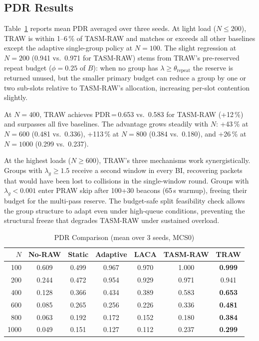 \documentclass[conference]{IEEEtran}
\begin{document}
\subsection{PDR Results}

Table~\ref{tab:pdr} reports mean PDR averaged over three seeds.
At light load ($N\!\leq\!200$), TRAW is within 1--6\,\% of TASM-RAW
and matches or exceeds all other baselines except the adaptive
single-group policy at $N\!=\!100$.
The slight regression at $N\!=\!200$ (0.941 vs.\ 0.971 for TASM-RAW)
stems from TRAW's pre-reserved repeat budget ($\phi\!=\!0.25$ of
$B$): when no group has $\lambda\!\geq\!\theta_\mathrm{repeat}$ the
reserve is returned unused, but the smaller primary budget can reduce
a group by one or two sub-slots relative to TASM-RAW's allocation,
increasing per-slot contention slightly.

At $N\!=\!400$, TRAW achieves PDR\,=\,0.653 vs.\ 0.583 for TASM-RAW
(+12\,\%) and surpasses all five baselines.
The advantage grows steadily with $N$: +43\,\% at $N\!=\!600$
(0.481 vs.\ 0.336), +113\,\% at $N\!=\!800$ (0.384 vs.\ 0.180),
and +26\,\% at $N\!=\!1000$ (0.299 vs.\ 0.237).

At the highest loads ($N\!\geq\!600$), TRAW's three mechanisms work
synergistically.
Groups with $\lambda_g\!\geq\!1.5$ receive a second window in every
BI, recovering packets that would have been lost to collisions in the
single-window round.
Groups with $\lambda_g\!<\!0.001$ enter PRAW skip after 100+30 beacons
(65\,s warmup), freeing their budget for the multi-pass reserve.
The budget-safe split feasibility check allows the group structure to
adapt even under high-queue conditions, preventing the structural
freeze that degrades TASM-RAW under sustained overload.

\begin{table}[!t]
\renewcommand{\arraystretch}{1.15}
\caption{PDR Comparison (mean over 3 seeds, MCS0)}
\label{tab:pdr}
\centering
\setlength{\tabcolsep}{4pt}
\begin{tabular}{@{}rcccccc@{}}
\toprule
$N$ & No-RAW & Static & Adaptive & LACA & TASM-RAW & \textbf{TRAW} \\
\midrule
 100 & 0.609 & 0.499 & 0.967 & 0.970 & 1.000 & \textbf{0.999} \\
 200 & 0.244 & 0.472 & 0.954 & 0.929 & 0.971 & 0.941 \\
 400 & 0.128 & 0.366 & 0.434 & 0.389 & 0.583 & \textbf{0.653} \\
 600 & 0.085 & 0.265 & 0.256 & 0.226 & 0.336 & \textbf{0.481} \\
 800 & 0.063 & 0.192 & 0.172 & 0.152 & 0.180 & \textbf{0.384} \\
1000 & 0.049 & 0.151 & 0.127 & 0.112 & 0.237 & \textbf{0.299} \\
\bottomrule
\end{tabular}
\end{table}
\end{document}
